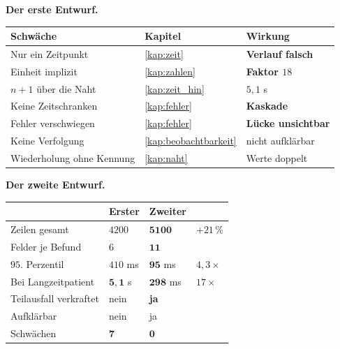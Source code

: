 \begin{merksatz}
\textbf{Der erste Entwurf.}

\begin{center}
{\small
\renewcommand{\arraystretch}{1.45}
\begin{tabular}{@{}P{3.2cm}P{2.4cm}P{2.4cm}@{}}
\toprule
\textbf{Schwäche} & \textbf{Kapitel} & \textbf{Wirkung}\\
\midrule
Nur ein Zeitpunkt & \ref{kap:zeit} & \textcolor{akzent}{\textbf{Verlauf falsch}}\\
Einheit implizit & \ref{kap:zahlen} & \textcolor{akzent}{\textbf{Faktor $18$}}\\
$n{+}1$ über die Naht & \ref{kap:zeit_hin} & \textcolor{akzent}{$5{,}1$ s}\\
Keine Zeitschranken & \ref{kap:fehler} & \textcolor{akzent}{\textbf{Kaskade}}\\
Fehler verschwiegen & \ref{kap:fehler} & \textcolor{akzent}{\textbf{Lücke unsichtbar}}\\
Keine Verfolgung & \ref{kap:beobachtbarkeit} & \textcolor{akzent}{nicht aufklärbar}\\
Wiederholung ohne Kennung & \ref{kap:naht} & \textcolor{akzent}{Werte doppelt}\\
\bottomrule
\end{tabular}}
\end{center}

\begin{center}
\begin{minipage}{0.88\textwidth}
\end{minipage}
\end{center}

\textbf{Der zweite Entwurf.}

\begin{center}
{\small
\renewcommand{\arraystretch}{1.45}
\begin{tabular}{@{}P{2.8cm}P{2.0cm}P{2.0cm}P{2.0cm}@{}}
\toprule
& \textbf{Erster} & \textbf{Zweiter} & \\
\midrule
Zeilen gesamt & $4200$ & $\mathbf{5100}$ & $+21\,\%$\\
Felder je Befund & $6$ & $\mathbf{11}$ & \\
$95.$ Perzentil & $410$ ms & $\mathbf{95}$ ms & $4{,}3\times$\\
Bei Langzeitpatient & $\mathbf{5{,}1}$ s & $\mathbf{298}$ ms & $17\times$\\
Teilausfall verkraftet & \textcolor{akzent}{nein} & \textcolor{gruen}{\textbf{ja}} & \\
Aufklärbar & \textcolor{akzent}{nein} & \textcolor{gruen}{ja} & \\
Schwächen & $\mathbf{7}$ & $\mathbf{0}$ & \\
\bottomrule
\end{tabular}}
\end{center}


\end{merksatz}
